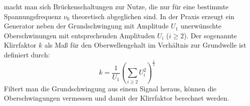 macht man sich Brückenschaltungen zur Nutze, die nur für eine bestimmte Spannungsfrequenz $\nu_0$ theoretisch abgeglichen sind. In der
Praxis erzeugt ein Generator neben der Grundschwingung mit Amplitude $U_1$ unerwünschte Oberschwinungen mit entsprechenden
Amplituden $U_i$ ($i\ge 2$). Der sogenannte Klirrfaktor $k$ als Maß für den Oberwellengehalt im Verhältnis zur Grundwelle ist definiert durch:
\begin{equation}
  k = \frac{1}{U_1} \left( \sum_{i\ge2} U_i ^2 \right) ^{\frac{1}{2}}
  \label{eq: klirr}
\end{equation}
Filtert man die Grundschwingung aus einem Signal heraus, können die Oberschwingungen vermessen und damit der Klirrfaktor berechnet werden.
